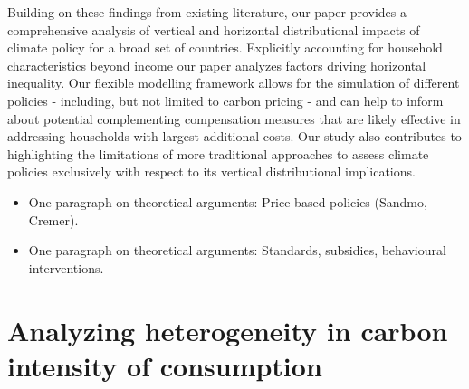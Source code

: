 \documentclass[12pt, a4paper]{article}
\begin{document}
Building on these findings from existing literature, our paper provides a comprehensive analysis of vertical and horizontal distributional impacts of climate policy for a broad set of countries. Explicitly accounting for household characteristics beyond income our paper analyzes factors driving horizontal inequality. Our flexible modelling framework allows for the simulation of different policies - including, but not limited to carbon pricing - and can help to inform about potential complementing compensation measures that are likely effective in addressing households with largest additional costs. Our study also contributes to highlighting the limitations of more traditional approaches to assess climate policies exclusively with respect to its vertical distributional implications.

\begin{itemize}
    \item One paragraph on theoretical arguments: Price-based policies (Sandmo, Cremer).
    \item One paragraph on theoretical arguments: Standards, subsidies, behavioural interventions.

\end{itemize}

\section{Analyzing heterogeneity in carbon intensity of consumption} \label{sec:methods}
\end{document}
